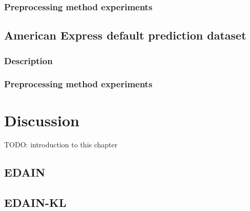 \documentclass{statsmsc}
\begin{document}
\subsection{Preprocessing method experiments}%
\label{sub:Preprocessing method experiments}




\section{American Express default prediction dataset}%
\label{sec:American Express default prediction dataset}%

\subsection{Description}%
\label{sub:Description}


\subsection{Preprocessing method experiments}%
\label{sub:Preprocessing method experiments}




\chapter{Discussion} %

TODO: introduction to this chapter

\section{EDAIN}%
\label{sec:EDAIN-discuss}


\section{EDAIN-KL}%
\label{sec:EDAIN-KL-discuss}


\end{document}
